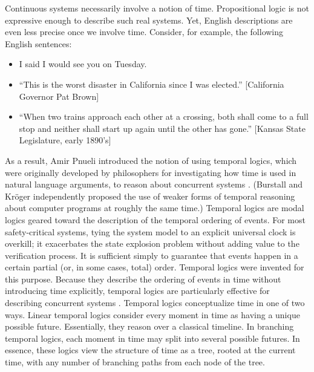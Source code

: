 \documentclass{elsarticle} %
\begin{document}
Continuous systems necessarily involve a notion of time. Propositional logic is not expressive enough to describe such real systems. Yet, English descriptions are even less precise once we involve time. Consider, for example, the following English sentences:
\begin{itemize}
\item I said I would see you on Tuesday.
\item ``This is the worst disaster in California since I was elected.'' [California Governor Pat Brown]%
\item ``When two trains approach each other at a crossing, both shall come to a full stop and neither shall start up again until the other has gone.'' [Kansas State Legislature, early 1890's]
\end{itemize}

As a result, Amir Pnueli introduced the notion of using temporal logics, which were originally developed by philosophers for investigating how time is used in natural language arguments, to reason about concurrent systems \cite{Pnu77}. (Burstall \cite{Bur74} and Kr\"oger \cite{Kro77} independently proposed the use of weaker forms of temporal reasoning about computer programs at roughly the same time.) Temporal logics are modal logics geared toward the description of the temporal ordering of events. For most safety-critical systems, tying the system model to an explicit universal clock is overkill; it exacerbates the state explosion problem without adding value to the verification process. It is sufficient simply to guarantee that events happen in a certain partial (or, in some cases, total) order. Temporal logics were invented for this purpose. Because they describe the ordering of events in time without introducing time explicitly, temporal logics are particularly effective for describing concurrent systems \cite{CGL93}.
Temporal logics conceptualize time in one of two ways. Linear temporal logics consider every moment in time as having a unique possible future. Essentially, they reason over a classical timeline. In branching temporal logics, each moment in time may split into several possible futures. In essence, these logics view the structure of time as a tree, rooted at the current time, with any number of branching paths from each node of the tree.
\end{document}
